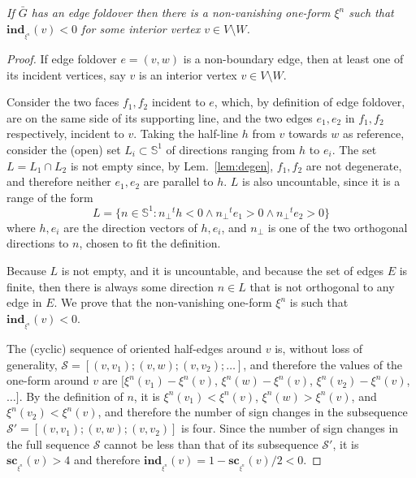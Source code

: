 \documentclass[11pt]{article}
\begin{document}
\emph{
If $\bar{G}$ has an edge foldover then there is a non-vanishing one-form $\xi^n$ such
that $\mathbf{ind}_{_{\xi^n}}(v) < 0$ for some interior vertex $v\in V\setminus W$. }
\begin{proof}
If edge foldover $e=(v,w)$ is a non-boundary edge, then at least one
of its incident vertices, say $v$ is an interior vertex $v\in
V\setminus W$. 

Consider the two faces $f_1,f_2$ incident to $e$, which, by definition of
edge foldover, are on the same side of its
supporting line, and the two edges $e_1,e_2$ in $f_1,f_2$ respectively,
incident to $v$. 
Taking the half-line $h$ from $v$ towards $w$ as reference, consider 
the (open) set $L_i\subset\mathbb{S}^1$ of directions ranging from $h$ to
$e_i$. 
The set $L=L_1\cap L_2$ is not empty since, by Lem.~\ref{lem:degen},
$f_1,f_2$ are not degenerate, and therefore neither $e_1,e_2$ are parallel
to $h$. $L$ is also uncountable, since it is a range of the form
\[ L = \{n\in\mathbb{S}^1 : 
			{n_{\perp}}^t {h} < 0 \wedge
			{n_{\perp}}^t {e}_1 > 0 \wedge
			{n_{\perp}}^t {e}_2 > 0\}\]
where ${h},{e}_i$ are the direction vectors of $h,e_i$, and
${n_\perp}$ is one of the two orthogonal directions to $n$, 
chosen to fit the definition. 

Because $L$ is not empty, and it is uncountable, and because the set of edges $E$ is finite,
then there is always some direction $n\in L$ that is not orthogonal to any edge in
$E$. We prove that the non-vanishing one-form $\xi^n$ is such that
$\mathbf{ind}_{_{\xi^n}}(v)<0$. 

The (cyclic) sequence of oriented half-edges {around} $v$ is, without loss of generality,
$\mathcal{S}=\left[(v,v_1);(v,w);(v,v_2);\dots\right]$, and therefore the values of the
one-form around $v$ are $[\xi^n(v_1)-\xi^n(v)$, $\xi^n(w)-\xi^n(v)$,
$\xi^n(v_2)-\xi^n(v)$, $\dots]$. 
By the definition of $n$, it is $\xi^n(v_1)<\xi^n(v)$, $\xi^n(w)>\xi^n(v)$,
and $\xi^n(v_2)<\xi^n(v)$, and therefore 
the number of sign changes in 
the subsequence
$\mathcal{S}'=[(v,v_1);(v,w);(v,v_2)]$ is four. 
Since the number of sign changes in the full sequence $\mathcal{S}$ cannot
be less
than that of its subsequence $\mathcal{S}'$, 
it is $\mathbf{sc}_{_{\xi^n}}(v)>4$ and therefore $\mathbf{ind}_{_{\xi^n}}(v)=1 - \mathbf{sc}_{_{\xi^n}}(v)/2 <0$. 
\end{proof}
\end{document}
